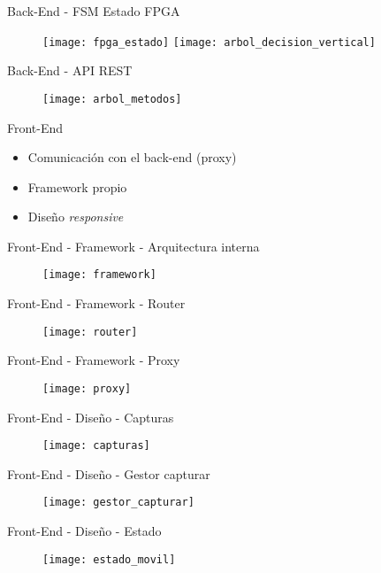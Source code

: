 \begin{frame}{Back-End - FSM Estado FPGA}
  \begin{figure}
    \texttt{[image: fpga\_estado]}
    \hfill
    \texttt{[image: arbol\_decision\_vertical]}
  \end{figure}
\end{frame}

\begin{frame}{Back-End - API REST}
  \begin{figure}
    \texttt{[image: arbol\_metodos]}
  \end{figure}
\end{frame}

\begin{frame}{Front-End}
  \begin{itemize}[<alert@+>]
    \item Comunicación con el back-end (proxy)
    \item Framework propio
    \item Diseño \textit{responsive}
  \end{itemize}
\end{frame}

\begin{frame}{Front-End - Framework - Arquitectura interna}
  \begin{figure}
    \texttt{[image: framework]}
  \end{figure}
\end{frame}

\begin{frame}{Front-End - Framework - Router}
  \begin{figure}
    \texttt{[image: router]}
  \end{figure}
\end{frame}

\begin{frame}{Front-End - Framework - Proxy}
  \begin{figure}
    \texttt{[image: proxy]}
  \end{figure}
\end{frame}

\begin{frame}{Front-End - Diseño - Capturas}
  \begin{figure}
    \texttt{[image: capturas]}
  \end{figure}
\end{frame}

\begin{frame}{Front-End - Diseño - Gestor capturar}
  \begin{figure}
    \texttt{[image: gestor\_capturar]}
  \end{figure}
\end{frame}

\begin{frame}{Front-End - Diseño - Estado}
  \begin{figure}
    \texttt{[image: estado\_movil]}
  \end{figure}
\end{frame}
